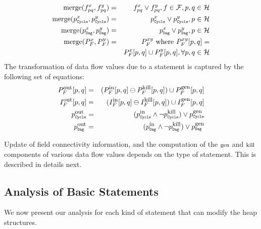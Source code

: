 \begin{eqnarray*}
  \merge( f_{\p\q}^x, f_{\p\q}^y ) &=& f_{\p\q}^x \vee f_{\p\q}^y , f \in \fields,
  \p,\q \in \heap \\
  \merge(\p_{\subC}^x, \p_{\subC}^y) &=& \p_{\subC}^x \vee
  \p_{\subC}^y, \p \in \heap \\
  \merge(\p_{\subD}^x, \p_{\subD}^y) &=& \p_{\subD}^x \vee
  \p_{\subD}^y, \p \in \heap \\
  \merge(P_F^{x}, P_F^{y})  &=& P_F^{xy} \mbox{ where }
   P_F^{xy}[{\p}, {\q}]  = \\ 
   && P_F^{x}[{\p}, {\q}] \cup
      P_F^{y}[{\p}, {\q}],   \forall {\p}, {\q} \in \heap\\
\end{eqnarray*}
The transformation of data flow values due to a statement
is captured by the following set of equations:
\begin{eqnarray*}
  P_F^{\dout}[\p,\q] &=& (\remOne{P_F^{\din}[\p,\q]}{P_F^{\dkill}[\p,\q]}) \cup
  P_F^{\dgen}[\p,\q] \\
  I_F^{\dout}[\p,\q] &=& (\remOne{I_F^{\din}[\p,\q]}{I_F^{\dkill}[\p,\q]}) \cup
  I_F^{\dgen}[\p,\q] \\
  \p_{\subC}^{\dout} &=& (\p_{\subC}^{\din} \wedge
  \neg\p_{\subC}^{\dkill} ) \vee \p_{\subC}^{\dgen}  \\
  \p_{\subD}^{\dout} &=& (\p_{\subD}^{\din} \wedge
  \neg\p_{\subD}^{\dkill} ) \vee \p_{\subD}^{\dgen} 
\end{eqnarray*}

Update of field connectivity information, and the computation
of the  $\mbox{\footnotesize gen}$ and $\mbox{\footnotesize kill}$ components of  various data flow
values depends on the type  of statement. This is described
in details next.

\subsection{Analysis of Basic
  Statements} \label{sec:Analysis_Rules}  
We now present  our analysis for each kind  of statement that
can  modify the heap structures.

